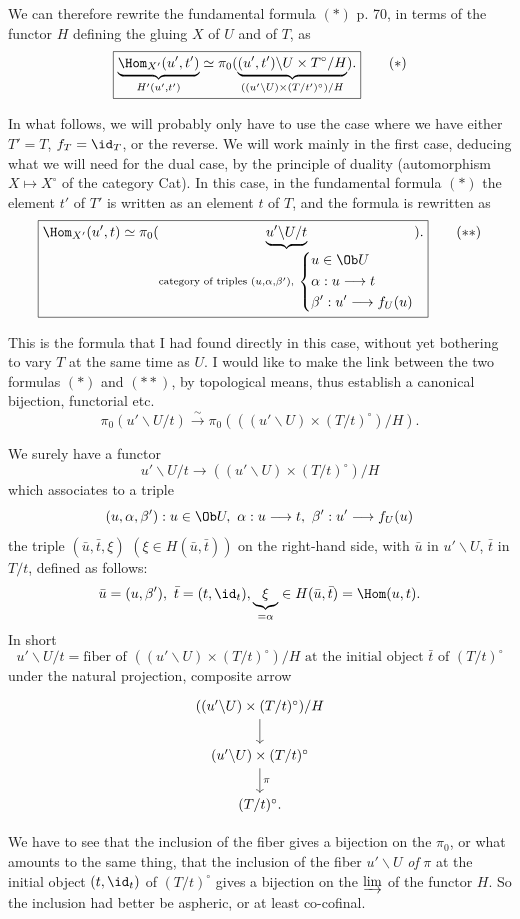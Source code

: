  We can therefore rewrite the fundamental formula $(*)$ p. 70, in terms of the functor $H$ defining the gluing $X$ of $U$ and of $T$, as
\[
\boxed{\underbrace{\Hom_{X'}(u',t')}_{H'(u',t')} \simeq \pi_0(\underbrace{(u',t')\backslash U\times T^{\circ}/H}_{((u'\backslash U)\times(T/t')^{\circ})/H}).}
\tag*{$(*)$}
\]

In what follows, we will probably only have to use the case where we have either $T'=T$, $f_T=\id_T$, or the reverse. We will work mainly in the first case, deducing what we will need for the dual case, by the principle of duality (automorphism $X\longmapsto X^{\circ}$ of the
category Cat). In this case, in the fundamental formula $(*)$ the element $t'$ of $T'$ is written as an element $t$ of $T$, and the formula is rewritten as
\[
\boxed{\Hom_{X'}(u',t) \simeq \pi_0(\underbrace{u'\backslash U/t}_{\text{category of triples } (u,\alpha,\beta'),\ \left\{\begin{aligned} &u\in \Ob U\\ &\alpha : u\longrightarrow t\\ &\beta' : u'\longrightarrow f_U(u)\end{aligned}\right.}).}
\tag*{$(**)$}
\]

This is the formula that I had found directly in this case, without yet bothering to vary $T$ at the same time as $U$. I would like to make the link between the two formulas $(*)$ and $(**)$, by topological means, thus establish a canonical bijection, functorial etc.
\[
\pi_0(u'\backslash U/t) \xrightarrow{\sim} \pi_0(((u'\backslash U)\times(T/t)^{\circ})/H).
\]

 We surely have a functor
\[
u'\backslash U/t \longrightarrow ((u'\backslash U)\times(T/t)^{\circ})/H
\]
which associates to a triple
\[
(u,\alpha,\beta') : u\in \Ob U,\ \alpha : u\longrightarrow t,\ \beta' : u'\longrightarrow f_U(u)
\]
the triple $(\bar u,\bar t,\xi)$ $(\xi\in H(\bar u,\bar t))$ on the right-hand side, with $\bar u$ in $u'\backslash U$, $\bar t$ in $T/t$, defined as follows:
\[
\bar u = (u,\beta'),\ \bar t = (t,\id_t), \underbrace{\xi}_{=\alpha} \in H(\bar u,\bar t) = \Hom(u,t).
\]
In short
\[
u'\backslash U/t = \text{fiber of } ((u'\backslash U)\times(T/t)^{\circ})/H \text{ at the initial object } \bar t \text{ of } (T/t)^{\circ}
\]
under the natural projection, composite arrow
\[
\begin{tikzcd}
((u'\backslash U)\times(T/t)^{\circ})/H \arrow[d] \\
(u'\backslash U)\times(T/t)^{\circ} \arrow[d, "\pi"] \\
(T/t)^{\circ}.
\end{tikzcd}
\]

We have to see that the inclusion of the fiber gives a bijection on the $\pi_0$, or what amounts to the same thing, that the inclusion of the fiber $u'\backslash U$ \textit{of} $\pi$ at the initial object $(t,\id_t)$ of $(T/t)^{\circ}$ gives a bijection on the $\varinjlim$ of the functor $H$. So the inclusion had better be aspheric, or at least co-cofinal. %